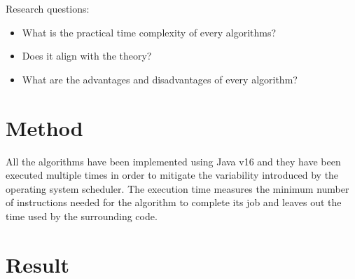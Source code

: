\documentclass{article}
\begin{document}
Research questions:
\begin{itemize}
    \item What is the practical time complexity of every algorithms?
    \item Does it align with the theory?
    \item What are the advantages and disadvantages of every algorithm?
\end{itemize}

\section{Method}
All the algorithms have been implemented using Java v16 and they have been executed multiple times in order to mitigate the variability introduced by the operating system scheduler.
The execution time measures the minimum number of instructions needed for the algorithm to complete its job and leaves out the time used by the surrounding code.

\newpage
\section{Result}
\end{document}
